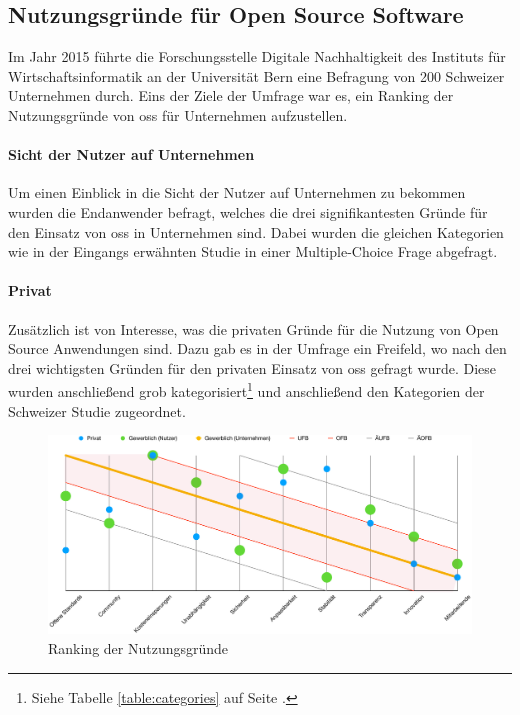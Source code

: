\documentclass[a4paper]{article}
\begin{document}
        \subsection{Nutzungsgründe für Open Source Software}
            \label{section:usageReasons}
            Im Jahr 2015 führte die Forschungsstelle Digitale Nachhaltigkeit des Instituts für Wirtschaftsinformatik an der Universität Bern eine Befragung von 200 Schweizer Unternehmen durch\cite{oss:studie}. Eins der Ziele der Umfrage war es, ein Ranking der Nutzungsgründe von \gls{oss} für Unternehmen aufzustellen.

            \paragraph{Sicht der Nutzer auf Unternehmen}
                Um einen Einblick in die Sicht der Nutzer auf Unternehmen zu bekommen wurden die Endanwender befragt, welches die drei signifikantesten Gründe für den Einsatz von \gls{oss} in Unternehmen sind. Dabei wurden die gleichen Kategorien wie in der Eingangs erwähnten Studie in einer Multiple-Choice Frage abgefragt.

            \paragraph{Privat}
                Zusätzlich ist von Interesse, was die privaten Gründe für die Nutzung von Open Source Anwendungen sind. Dazu gab es in der Umfrage ein Freifeld, wo nach den drei wichtigsten Gründen für den privaten Einsatz von \gls{oss} gefragt wurde. Diese wurden anschließend grob kategorisiert\footnote{Siehe Tabelle \ref{table:categories} auf Seite \pageref{table:categories}.} und anschließend den Kategorien der Schweizer Studie zugeordnet.
                
            \begin{figure}
                \includegraphics[width=\textwidth]{assets/results/commercialReasoning/usageReasonRanking}
                \caption{Ranking der Nutzungsgründe}
                \label{figure:usageRanking}
            \end{figure}
                
\end{document}
